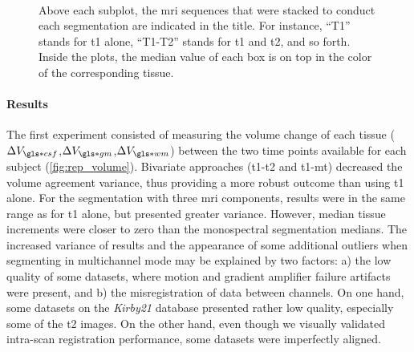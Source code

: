 \begin{figure*}[!htbp]
  \centering
  \\
  \caption[Repeatability experiment]{Above each subplot, the \gls*{mri} sequences that
  were stacked to conduct each segmentation are indicated in the title.
  For instance, ``T1'' stands for \gls*{t1} alone, ``T1-T2'' stands for 
  \gls*{t1} and \gls*{t2}, and so forth.
  Inside the plots, the median value of each box is on top in the color of the corresponding tissue.
  \label{fig:repeatability}}
\end{figure*}

\paragraph{Results}
The first experiment consisted of measuring the volume change of each tissue 
 ($\Delta V_{\gls*{csf}}$,$\Delta V_{\gls*{gm}}$,$\Delta V_{\gls*{wm}}$) between the 
 two time points available for each subject (\autoref{fig:rep_volume}).
Bivariate approaches (\gls*{t1}-\gls*{t2} and \gls*{t1}-\gls*{mt}) decreased the volume
  agreement variance, thus providing a more robust outcome than using \gls*{t1} alone.
For the segmentation with three \gls*{mri} components, results were in the same range
  as for \gls*{t1} alone, but presented greater variance.
However, median tissue increments were closer to zero than the 
  monospectral segmentation medians.
The increased variance of results and the appearance of some additional
  outliers when segmenting in multichannel mode may be explained by two
  factors: a) the low quality of some datasets, where motion and gradient
  amplifier failure artifacts were present, and b) the misregistration of data
  between channels.
On one hand, some datasets on the \emph{Kirby21} database presented rather low quality,
  especially some of the \gls*{t2} images.
On the other hand, even though we visually validated intra-scan registration performance,
  some datasets were imperfectly aligned.

